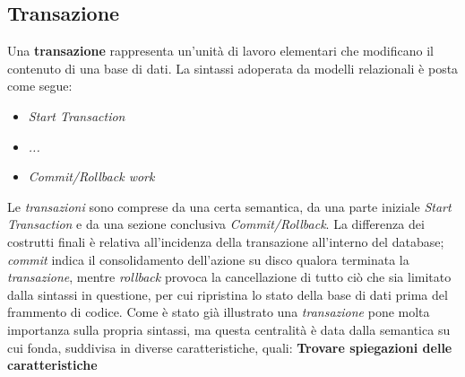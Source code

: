 \documentclass{article}
\begin{document}
\subsection*{Transazione}
\large
Una \textbf{transazione} rappresenta un'unità di lavoro elementari che modificano il contenuto di una base di dati. La sintassi adoperata da modelli relazionali è posta come segue:
\begin{itemize}[label={ }, leftmargin=1cm]
    \itemsep0em
    \item \textit{Start Transaction}
    \item \textit{...}
    \item \textit{Commit/Rollback work}
\end{itemize}
Le \textit{transazioni} sono comprese da una certa semantica, da una parte iniziale \textit{Start Transaction} e da una sezione conclusiva \textit{Commit/Rollback}. La differenza dei costrutti finali è relativa all'incidenza della transazione all'interno del database; \textit{commit} indica il consolidamento dell'azione su disco qualora terminata la \textit{transazione}, mentre \textit{rollback} provoca la cancellazione di tutto ciò che sia limitato dalla sintassi in questione, per cui ripristina lo stato della base di dati prima del frammento di codice.
Come è stato già illustrato una \textit{transazione} pone molta importanza sulla propria sintassi, ma questa centralità è data dalla semantica su cui fonda, suddivisa in diverse caratteristiche, quali: \textbf{Trovare spiegazioni delle caratteristiche}
\end{document}
